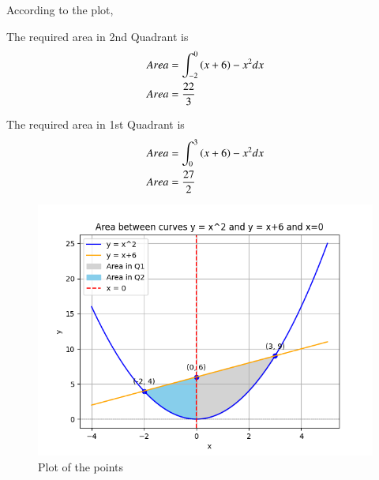 \documentclass[journal]{IEEEtran}
\begin{document}
According to the plot,

The required area in 2nd Quadrant is 
\begin{align}
    Area&=\int_{-2}^{0}\left(x+6\right)-x^{2}dx\\
    Area&=\frac{22}{3}
\end{align}


The required area in 1st Quadrant is 
\begin{align}
    Area&=\int_{0}^{3}\left(x+6\right)-x^{2}dx\\
    Area&=\frac{27}{2}
\end{align}


\begin{figure}[h!]
\renewcommand{\thefigure}{1}
    \centering
    \includegraphics[width=0.7\linewidth]{figs/plot.png}
    \caption{Plot of the points}
    \label{fig9.9.2.43.1}
\end{figure}
\end{document}
